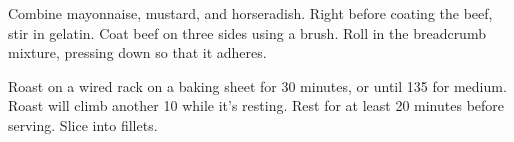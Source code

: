 \begin{recipe}
Combine mayonnaise, mustard, and horseradish. Right before coating the beef, stir in gelatin. Coat beef on three 
sides using a brush. Roll in the breadcrumb mixture, pressing down so that it adheres. 

Roast on a wired rack on a baking sheet for 30 minutes, or until 135\degree{} for medium. Roast will climb another
10\degree{} while it's resting. Rest for at least 20 minutes before serving. Slice into fillets. 


\end{recipe}
